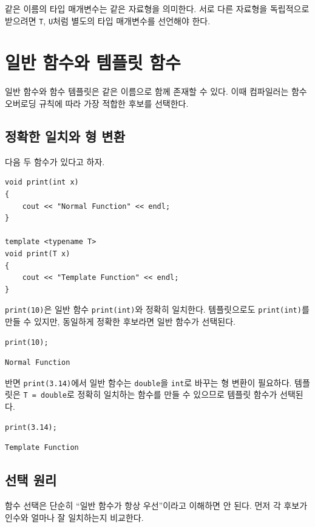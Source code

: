 \documentclass[11pt,a4paper]{article}
\begin{document}
\begin{importantbox}
같은 이름의 타입 매개변수는 같은 자료형을 의미한다. 서로 다른 자료형을 독립적으로 받으려면 \texttt{T}, \texttt{U}처럼 별도의 타입 매개변수를 선언해야 한다.
\end{importantbox}

\section{일반 함수와 템플릿 함수}
일반 함수와 함수 템플릿은 같은 이름으로 함께 존재할 수 있다. 이때 컴파일러는 함수 오버로딩 규칙에 따라 가장 적합한 후보를 선택한다.

\subsection{정확한 일치와 형 변환}
다음 두 함수가 있다고 하자.

\begin{lstlisting}
void print(int x)
{
    cout << "Normal Function" << endl;
}

template <typename T>
void print(T x)
{
    cout << "Template Function" << endl;
}
\end{lstlisting}

\texttt{print(10)}은 일반 함수 \texttt{print(int)}와 정확히 일치한다. 템플릿으로도 \texttt{print(int)}를 만들 수 있지만, 동일하게 정확한 후보라면 일반 함수가 선택된다.

\begin{lstlisting}
print(10);
\end{lstlisting}

\begin{verbatim}
Normal Function
\end{verbatim}

반면 \texttt{print(3.14)}에서 일반 함수는 \texttt{double}을 \texttt{int}로 바꾸는 형 변환이 필요하다. 템플릿은 \texttt{T = double}로 정확히 일치하는 함수를 만들 수 있으므로 템플릿 함수가 선택된다.

\begin{lstlisting}
print(3.14);
\end{lstlisting}

\begin{verbatim}
Template Function
\end{verbatim}

\subsection{선택 원리}
함수 선택은 단순히 ``일반 함수가 항상 우선''이라고 이해하면 안 된다. 먼저 각 후보가 인수와 얼마나 잘 일치하는지 비교한다.
\end{document}
